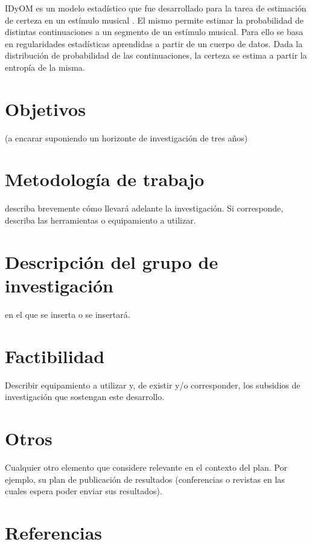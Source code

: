 \documentclass[a4paper,11pt]{article}
\begin{document}
IDyOM es un modelo estadístico que fue desarrollado para la tarea de estimación
de certeza en un estímulo musical \cite{pearce2005construction}. El mismo
permite estimar la probabilidad de distintas continuaciones a un segmento de un
estímulo musical. Para ello se basa en regularidades estadísticas aprendidas a
partir de un cuerpo de datos. Dada la distribución de probabilidad de las
continuaciones, la certeza se estima a partir la entropía de la misma.


\section*{Objetivos} 
    (a encarar suponiendo un horizonte de investigación de tres años)

\section*{Metodología de trabajo}
describa brevemente cómo llevará adelante la
investigación. Si corresponde, describa las herramientas o equipamiento a utilizar.

\section*{Descripción del grupo de investigación}
en el que se inserta o se insertará.

\section*{Factibilidad}

Describir equipamiento a utilizar y, de existir y/o
corresponder, los subsidios
de investigación que sostengan este desarrollo.

\section*{Otros}

Cualquier otro elemento que considere relevante en el contexto del
plan. Por ejemplo, su plan de publicación de resultados (conferencias o revistas en las
cuales espera poder enviar sus resultados).

\section*{Referencias}


\end{document}
